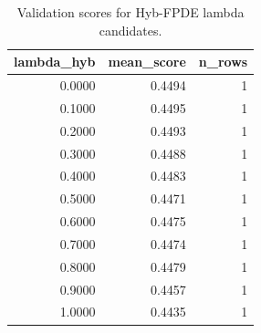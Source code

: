 \begin{table}[t]
\caption{Validation scores for Hyb-FPDE lambda candidates.}
\label{tab:lambda_distribution_computed}
\centering
\begin{tabular}{rrr}
\toprule
lambda\_hyb & mean\_score & n\_rows \\
\midrule
0.0000 & 0.4494 & 1 \\
0.1000 & 0.4495 & 1 \\
0.2000 & 0.4493 & 1 \\
0.3000 & 0.4488 & 1 \\
0.4000 & 0.4483 & 1 \\
0.5000 & 0.4471 & 1 \\
0.6000 & 0.4475 & 1 \\
0.7000 & 0.4474 & 1 \\
0.8000 & 0.4479 & 1 \\
0.9000 & 0.4457 & 1 \\
1.0000 & 0.4435 & 1 \\
\bottomrule
\end{tabular}

\end{table}
